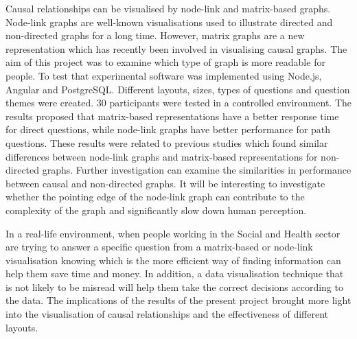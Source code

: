 \documentclass{l4proj}
\begin{document}
Causal relationships can be visualised by node-link and matrix-based graphs. Node-link graphs are well-known visualisations used to illustrate directed and non-directed graphs for a long time. However, matrix graphs are a new representation which has recently been involved in visualising causal graphs. The aim of this project was to examine which type of graph is more readable for people. To test that experimental software was implemented using Node.js, Angular and PostgreSQL. Different layouts, sizes, types of questions and question themes were created. 30 participants were tested in a controlled environment. The results proposed that matrix-based representations have a better response time for direct questions, while node-link graphs have better performance for path questions. These results were related to previous studies which found similar differences between node-link graphs and matrix-based representations for non-directed graphs. Further investigation can examine the similarities in performance between causal and non-directed graphs. It will be interesting to investigate whether the pointing edge of the node-link graph can contribute to the complexity of the graph and significantly slow down human perception.

In a real-life environment, when people working in the Social and Health sector are trying to answer a specific question from a matrix-based or node-link visualisation knowing which is the more efficient way of finding information can help them save time and money. In addition, a data visualisation technique that is not likely to be misread will help them take the correct decisions according to the data. The implications of the results of the present project brought more light into the visualisation of causal relationships and the effectiveness of different layouts.
\end{document}
